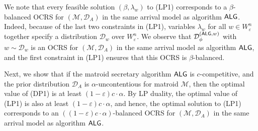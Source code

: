 \documentclass[11pt]{article}
\newcommand{\D}{\mathcal D}
\newcommand{\M}{{\mathcal M}}
\newcommand{\alg}{\textnormal{\sffamily ALG}}
\newcommand{\eps}{\varepsilon}
\begin{document}
We note that every feasible solution $(\beta,\lambda_{w})$ to (LP1) corresponds to a $\beta$-balanced OCRS for $(\M,\D_A)$ in the same arrival model as algorithm $\alg$. Indeed, because of the last two constraints in (LP1), variables $\lambda_{w}$ for all $w\in W_{\eps}^n$ together specify a distribution $\D_{w}$ over $W_{\eps}^n$. We observe that $\D_{\phi}^{(\alg,w)}$ with $w\sim\D_{w}$ is an OCRS for $(\M,\D_A)$ in the same arrival model as algorithm $\alg$, and the first constraint in (LP1) ensures that this OCRS is $\beta$-balanced.

Next, we show that if the matroid secretary algorithm $\alg$ is $c$-competitive, and the prior distribution $\D_A$ is $\alpha$-uncontentious for matroid $\M$, then the optimal value of (DP1) is at least $(1-\eps)c\cdot\alpha$. By LP duality, the optimal value of (LP1) is also at least $(1-\eps)c\cdot\alpha$, and hence, the optimal solution to (LP1) corresponds to an $((1-\eps)c\cdot\alpha)$-balanced OCRS for $(\M,\D_A)$ in the same arrival model as algorithm $\alg$.
\end{document}
